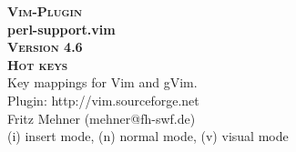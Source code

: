 \documentclass[oneside,10pt,landscape,DIV17]{scrartcl}
\newcommand{\Pluginversion}{4.6}
\begin{document}
%

\begin{multicols}{3}
%
\begin{center}
%
\textbf{\textsc{\small{Vim-Plugin}}}\\
\textbf{\LARGE{perl-support.vim}}\\
\textbf{\textsc{\small{Version \Pluginversion}}}\\
\vspace{5mm}%
\textbf{\textsc{\Huge{Hot keys}}}\\ 
\vspace{5mm}%
Key mappings for Vim and gVim.\\
Plugin: http://vim.sourceforge.net\\
Fritz Mehner (mehner@fh-swf.de)\\
\vspace{1.0mm}
{\normalsize (i)} insert mode, {\normalsize (n)} normal mode, {\normalsize (v)} visual mode\\
\vspace{4.0mm}


\end{center}
\end{multicols}
\end{document}
